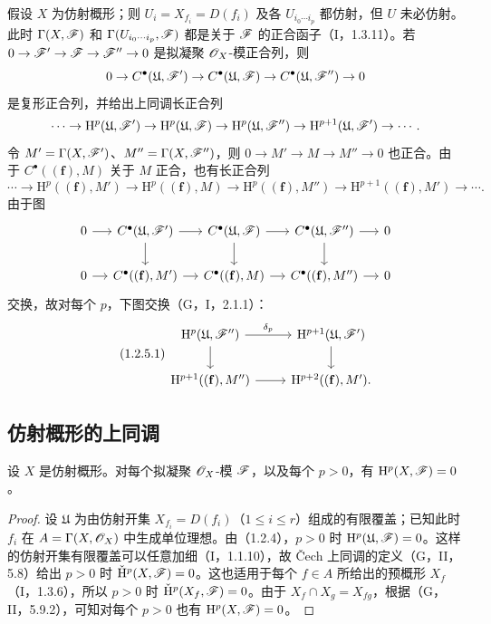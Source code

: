 假设 $X$ 为仿射概形；则 $U_i=X_{f_i}=D(f_i)$ 及各 $U_{i_0\cdots i_p}$ 都仿射，但 $U$ 未必仿射。此时 $\Gamma(X,\mathscr F)$ 和 $\Gamma(U_{i_0\cdots i_p},\mathscr F)$ 都是关于 $\mathscr F$ 的正合函子（I，1.3.11）。若 $0\to\mathscr F'\to\mathscr F\to\mathscr F''\to0$ 是拟凝聚 $\mathscr O_X$-模正合列，则
\[
0\to C^\bullet(\mathfrak U,\mathscr F')\to C^\bullet(\mathfrak U,\mathscr F)\to C^\bullet(\mathfrak U,\mathscr F'')\to0
\]
是复形正合列，并给出上同调长正合列
\[
\cdots\to\mathrm H^p(\mathfrak U,\mathscr F')\to\mathrm H^p(\mathfrak U,\mathscr F)
\to\mathrm H^p(\mathfrak U,\mathscr F'')\to\mathrm H^{p+1}(\mathfrak U,\mathscr F')\to\cdots.
\]
令 $M'=\Gamma(X,\mathscr F')$、$M''=\Gamma(X,\mathscr F'')$，则 $0\to M'\to M\to M''\to0$ 也正合。由于 $C^\bullet((\mathbf f),M)$ 关于 $M$ 正合，也有长正合列
\[
\cdots\to\mathrm H^p((\mathbf f),M')\to\mathrm H^p((\mathbf f),M)
\to\mathrm H^p((\mathbf f),M'')\to\mathrm H^{p+1}((\mathbf f),M')\to\cdots.
\]
由于图
\[
\begin{tikzcd}[column sep=small]
0\arrow[r]&C^\bullet(\mathfrak U,\F')\arrow[r]\arrow[d]&C^\bullet(\mathfrak U,\F)\arrow[r]\arrow[d]&C^\bullet(\mathfrak U,\F'')\arrow[r]\arrow[d]&0\\
0\arrow[r]&C^\bullet((\mathbf f),M')\arrow[r]&C^\bullet((\mathbf f),M)\arrow[r]&C^\bullet((\mathbf f),M'')\arrow[r]&0
\end{tikzcd}
\]
交换，故对每个 $p$，下图交换（G，I，2.1.1）：
\begin{equation}\tag{1.2.5.1}
\begin{tikzcd}
\mathrm H^p(\mathfrak U,\F'')\arrow[r,"\delta_p"]\arrow[d]&\mathrm H^{p+1}(\mathfrak U,\F')\arrow[d]\\
\mathrm H^{p+1}((\mathbf f),M'')\arrow[r]&\mathrm H^{p+2}((\mathbf f),M').
\end{tikzcd}
\end{equation}

\subsection{仿射概形的上同调}
设 $X$ 是仿射概形。对每个拟凝聚 $\mathscr O_X$-模 $\mathscr F$，以及每个 $p>0$，有 $\mathrm H^p(X,\mathscr F)=0$。
\begin{proof}
设 $\mathfrak U$ 为由仿射开集 $X_{f_i}=D(f_i)$（$1\leq i\leq r$）组成的有限覆盖；已知此时 $f_i$ 在 $A=\Gamma(X,\mathscr O_X)$ 中生成单位理想。由（1.2.4），$p>0$ 时 $\mathrm H^p(\mathfrak U,\mathscr F)=0$。这样的仿射开集有限覆盖可以任意加细（I，1.1.10），故 Čech 上同调的定义（G，II，5.8）给出 $p>0$ 时 $\check{\mathrm H}^p(X,\mathscr F)=0$。这也适用于每个 $f\in A$ 所给出的预概形 $X_f$（I，1.3.6），所以 $p>0$ 时 $\check{\mathrm H}^p(X_f,\mathscr F)=0$。由于 $X_f\cap X_g=X_{fg}$，根据（G，II，5.9.2），可知对每个 $p>0$ 也有 $\mathrm H^p(X,\mathscr F)=0$。
\end{proof}

